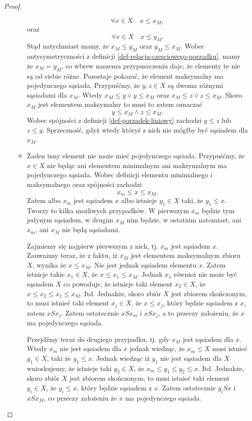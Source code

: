 \documentclass[12pt,a4paper]{report}
\begin{document}
\begin{proof}
\begin{enumerate}
\begin{itemize}
$$
\forall x \in X \quad x \leq x_M,
$$
oraz 
$$
\forall x \in X \quad x \leq y_M.
$$
Stąd natychmiast mamy, że $x_M \leq y_M$ oraz $y_M \leq  x_M$. Wobec antysymetryczności z definicji \ref{def-relacja-czesciowego-porzadku}, mamy że $x_M = y_M$, co wbrew naszemu przypuszczeniu daje, że elementy te nie są od siebie różne.
Pozostaje pokazać, że element maksymalny ma pojedynczego sąsiada. Przypuśćmy, że $y, z \in X$ są dwoma różnymi sąsiadami dla $x_M$. Wtedy $ x_M \leq y \lor y \leq x_M$ oraz $ x_M \leq z \lor z \leq x_M$. Skoro $x_M$ jest elementem maksymalny to musi to zatem oznaczać
$$
y \leq x_M \land z \leq x_M.
$$ 
Wobec spójności z definicji \ref{def-porzadek-liniowy} zachodzi $y \leq z$ lub $z \leq y$. Sprzeczność, gdyż wtedy któryś z nich nie mógłby być sąsiadem dla $x_M$.

\item Żaden inny element nie może mieć pojedynczego sąsiada. Przypuśćmy, że $x \in X$ nie będąc ani elementem minimalnym ani maksymalnym ma pojedynczego sąsiada. Wobec definicji elementu minimalnego i maksymalnego oraz spójności zachodzi
$$
x_m \leq x \leq x_M.
$$
Zatem albo $x_m$ jest sąsiadem $x$ albo istnieje $y_1 \in X$ taki, że $y_1 \leq x$.
Tworzy to kilka możliwych przypadków. W pierwszym $x_m$ będzie tym jedynym sąsiadem, w drugim $x_M$ nim będzie, w ostatnim natomiast, ani $x_m$, ani $x_M$ nie będą sąsiadami.

Zajmiemy się najpierw pierwszym z nich, tj. $x_m$ jest sąsiadem $x$. Zauważmy teraz, że z faktu, iż $x_M$ jest elementem maksymalnym zbioru $X$, wynika że $ x \leq x_M$. Nie jest jednak sąsiadem elementu $x$. Zatem istnieje takie $x_1 \in X$, że $x\leq x_1 \leq x_M$. Jednak $x_1$ również nie może być sąsiadem $X$ co powoduje, że istnieje taki element $x_2 \in X$, że $x \leq x_2 \leq x_1 \leq x_M$. Itd. Jednakże, skoro zbiór $X$ jest zbiorem skończonym, to musi istnieć taki element $x_j \in X$, że $x \leq x_j$, który będzie sąsiadem z $x$, zatem $xSx_j$. Zatem ostatecznie $xSx_m$ i $xSx_j$, a to przeczy założeniu, że $x$ ma pojedynczego sąsiada. 

Przejdźmy teraz do drugiego przypadku, tj. gdy $x_M$ jest sąsiadem dla $x$. Wtedy $x_m$ nie jest sąsiadem dla $x$ jednak wiedząc, że $x_m \leq X$ musi istnieć $y_1\in X$, taki że $y_1 \leq x$. Jednak wiedząc iż $y_1$ nie jest sąsiadem dla $X$ wnioskujemy, że istnieje taki $y_2 \in X$, że $x_m \leq y_1 \leq y_2 \leq x$. Itd.  Jednakże, skoro zbiór $X$ jest zbiorem skończonym, to musi istnieć taki element $y_i \in X$, że $y_i \leq x$, który będzie sąsiadem z $x$. Zatem ostatecznie $y_iSx$ i $xSx_M$, co przeczy założeniu że $x$ ma pojedynczego sąsiada.


\end{itemize}
\end{enumerate}
\end{proof}
\end{document}
